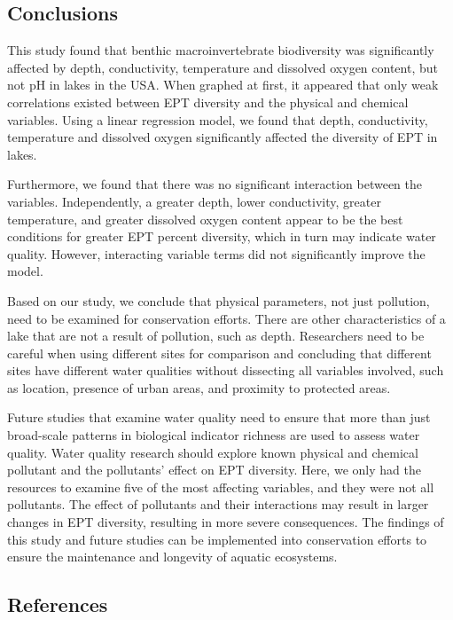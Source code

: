 \documentclass[]{article}
\begin{document}
\subsection{Conclusions}\label{conclusions}

This study found that benthic macroinvertebrate biodiversity was
significantly affected by depth, conductivity, temperature and dissolved
oxygen content, but not pH in lakes in the USA. When graphed at first,
it appeared that only weak correlations existed between EPT diversity
and the physical and chemical variables. Using a linear regression
model, we found that depth, conductivity, temperature and dissolved
oxygen significantly affected the diversity of EPT in lakes.

Furthermore, we found that there was no significant interaction between
the variables. Independently, a greater depth, lower conductivity,
greater temperature, and greater dissolved oxygen content appear to be
the best conditions for greater EPT percent diversity, which in turn may
indicate water quality. However, interacting variable terms did not
significantly improve the model.

Based on our study, we conclude that physical parameters, not just
pollution, need to be examined for conservation efforts. There are other
characteristics of a lake that are not a result of pollution, such as
depth. Researchers need to be careful when using different sites for
comparison and concluding that different sites have different water
qualities without dissecting all variables involved, such as location,
presence of urban areas, and proximity to protected areas.

Future studies that examine water quality need to ensure that more than
just broad-scale patterns in biological indicator richness are used to
assess water quality. Water quality research should explore known
physical and chemical pollutant and the pollutants' effect on EPT
diversity. Here, we only had the resources to examine five of the most
affecting variables, and they were not all pollutants. The effect of
pollutants and their interactions may result in larger changes in EPT
diversity, resulting in more severe consequences. The findings of this
study and future studies can be implemented into conservation efforts to
ensure the maintenance and longevity of aquatic ecosystems.

\subsection{References}\label{references}
\end{document}
